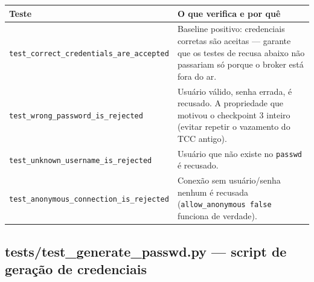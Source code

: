 \documentclass[10pt,a4paper]{article}
\begin{document}
\begin{center}
\begin{longtable}{L{5cm}L{9.5cm}}
\toprule
\textbf{Teste} & \textbf{O que verifica e por quê} \\
\midrule
\endhead
\texttt{test\_\allowbreak correct\_\allowbreak credentials\_\allowbreak are\_\allowbreak accepted} & Baseline positivo: credenciais corretas são aceitas — garante que os testes de recusa abaixo não passariam só porque o broker está fora do ar. \\
\texttt{test\_\allowbreak wrong\_\allowbreak password\_\allowbreak is\_\allowbreak rejected} & Usuário válido, senha errada, é recusado. A propriedade que motivou o checkpoint 3 inteiro (evitar repetir o vazamento do TCC antigo). \\
\texttt{test\_\allowbreak unknown\_\allowbreak username\_\allowbreak is\_\allowbreak rejected} & Usuário que não existe no \texttt{passwd} é recusado. \\
\texttt{test\_\allowbreak anonymous\_\allowbreak connection\_\allowbreak is\_\allowbreak rejected} & Conexão sem usuário/senha nenhum é recusada (\texttt{allow\_\allowbreak anonymous false} funciona de verdade). \\
\bottomrule
\end{longtable}
\end{center}

\subsection{tests/test\_\allowbreak generate\_\allowbreak passwd.py --- script de geração de credenciais}
\end{document}
